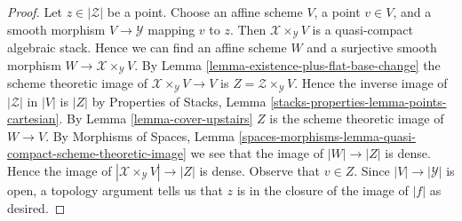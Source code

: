 \documentclass[10pt,a4paper]{amsart}
\theoremstyle{plain}
\theoremstyle{definition}
\theoremstyle{remark}
\numberwithin{equation}{subsection}
\begin{document}
\begin{proof}
Let $z \in |\mathcal{Z}|$ be a point.
Choose an affine scheme $V$, a point $v \in V$, and a smooth morphism
$V \to \mathcal{Y}$ mapping $v$ to $z$.
Then $\mathcal{X} \times_\mathcal{Y} V$ is a quasi-compact algebraic stack.
Hence we can find an affine scheme $W$ and a surjective smooth
morphism $W \to \mathcal{X} \times_\mathcal{Y} V$.
By Lemma \ref{lemma-existence-plus-flat-base-change}
the scheme theoretic image of
$\mathcal{X} \times_\mathcal{Y} V \to V$ is
$Z = \mathcal{Z} \times_\mathcal{Y} V$.
Hence the inverse image of $|\mathcal{Z}|$ in $|V|$ is $|Z|$ by
Properties of Stacks, Lemma \ref{stacks-properties-lemma-points-cartesian}.
By Lemma \ref{lemma-cover-upstairs} $Z$ is
the scheme theoretic image of $W \to V$.
By Morphisms of Spaces, Lemma
\ref{spaces-morphisms-lemma-quasi-compact-scheme-theoretic-image}
we see that the image of $|W| \to |Z|$ is dense.
Hence the image of $|\mathcal{X} \times_\mathcal{Y} V| \to |Z|$
is dense. Observe that $v \in Z$.
Since $|V| \to |\mathcal{Y}|$ is open, a topology argument
tells us that $z$ is in the closure of the image of $|f|$ as desired.
\end{proof}
\end{document}
